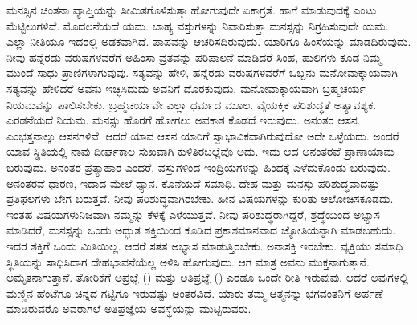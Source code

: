 ಮನಸ್ಸಿನ ಚಿಂತನಾ ವ್ಯಾಪ್ತಿಯನ್ನು ಸೀಮಿತಗೊಳಿಸುತ್ತಾ ಹೋಗುವುದೇ ಏಕಾಗ್ರತೆ. ಹಾಗೆ ಮಾಡುವುದಕ್ಕೆ ಎಂಟು ಮೆಟ್ಟಿಲುಗಳಿವೆ. ಮೊದಲನೆಯದೆ ಯಮ. ಬಾಹ್ಯ ವಸ್ತುಗಳನ್ನು ನಿವಾರಿಸುತ್ತಾ ಮನಸ್ಸನ್ನು ನಿಗ್ರಹಿಸುವುದೇ ಯಮ. ಎಲ್ಲಾ ನೀತಿಯೂ ಇದರಲ್ಲಿ ಅಡಕವಾಗಿದೆ. ಪಾಪವನ್ನು ಆಚರಿಸದಿರುವುದು. ಯಾರಿಗೂ ಹಿಂಸೆಯನ್ನು ಮಾಡದಿರುವುದು. ನೀವು ಹನ್ನೆರಡು ವರುಷಗಳವರೆಗೆ ಅಹಿಂಸಾ ವ್ರತವನ್ನು ಪರಿಪಾಲನೆ ಮಾಡಿದರೆ ಸಿಂಹ, ಹುಲಿಗಳು ಕೂಡ ನಿಮ್ಮ ಮುಂದೆ ಸಾಧು ಪ್ರಾಣಿಗಳಾಗುವುವು. ಸತ್ಯವನ್ನು ಹೇಳಿ, ಹನ್ನೆರಡು ವರುಷಗಳವರೆಗೆ ಒಬ್ಬನು ಮನೋವಾಕ್ಕಾಯವಾಗಿ ಸತ್ಯವನ್ನು ಹೇಳಿದರೆ ಅವನು ಇಚ್ಛಿಸಿದುದು ಅವನಿಗೆ ದೊರಕುವುದು. ಮನೋವಾಕ್ಕಾಯವಾಗಿ ಬ್ರಹ್ಮಚರ್ಯ ನಿಯಮವನ್ನು ಪಾಲಿಸಬೇಕು. ಬ್ರಹ್ಮಚರ್ಯವೇ ಎಲ್ಲಾ ಧರ್ಮದ ಮೂಲ. ವೈಯಕ್ತಿಕ ಪರಿಶುದ್ಧತೆ ಅತ್ಯಾವಶ್ಯಕ. ಎರಡನೆಯದೆ ನಿಯಮ. ಮನಸ್ಸು ಹೊರಗೆ ಹೋಗಲು ಅವಕಾಶ ಕೊಡದೆ ಇರುವುದು. ಅನಂತರ ಆಸನ. ಎಂಭತ್ತನಾಲ್ಕು ಆಸನಗಳಿವೆ. ಆದರೆ ಯಾವ ಆಸನ ಯಾರಿಗೆ ಸ್ವಾಭಾವಿಕವಾಗಿರುವುದೋ ಅದೇ ಒಳ್ಳೆಯದು. ಅಂದರೆ ಯಾವ ಸ್ಥಿತಿಯಲ್ಲಿ ನಾವು ದೀರ್ಘಕಾಲ ಸುಖವಾಗಿ ಕುಳಿತಿರಬಲ್ಲೆವೊ ಅದು. ಇದು ಆದ ಅನಂತರವೆ ಪ್ರಾಣಾಯಾಮ ಬರುವುದು. ಅನಂತರ ಪ್ರತ್ಯಾಹಾರ ಎಂದರೆ, ವಸ್ತುಗಳಿಂದ ಇಂದ್ರಿಯಗಳನ್ನು ಹಿಂದಕ್ಕೆ ಎಳೆದುಕೊಂಡು ಬರುವುದು. ಅನಂತರವೆ ಧಾರಣ, ಇದಾದ ಮೇಲೆ ಧ್ಯಾನ. ಕೊನೆಯದೆ ಸಮಾಧಿ. ದೇಹ ಮತ್ತು ಮನಸ್ಸು ಪರಿಶುದ್ಧವಾದಷ್ಟು ಪ್ರತಿಫಲಗಳು ಬೇಗ ಬರುತ್ತವೆ. ನೀವು ಪರಿಶುದ್ಧವಾಗಿರಬೇಕು. ಹೀನ ವಿಷಯಗಳನ್ನು ಕುರಿತು ಆಲೋಚಿಸಕೂಡದು. ಇಂತಹ ವಿಷಯಗಳು\break ನಿಜವಾಗಿ ನಮ್ಮನ್ನು ಕೆಳಕ್ಕೆ ಎಳೆಯುತ್ತವೆ. ನೀವು ಪರಿಶುದ್ಧರಾಗಿದ್ದರೆ, ಶ್ರದ್ಧೆಯಿಂದ ಅಭ್ಯಾಸ ಮಾಡಿದರೆ, ಮನಸ್ಸನ್ನು ಒಂದು ಅದ್ಭುತ ಶಕ್ತಿಯಿಂದ ಕೂಡಿದ ಪ್ರಕಾಶಮಾನವಾದ ಜ್ಯೋತಿಯನ್ನಾಗಿ ಮಾಡಬಹುದು. ಇದರ ಶಕ್ತಿಗೆ ಒಂದು ಮಿತಿಯಿಲ್ಲ. ಆದರೆ ಸತತ ಅಭ್ಯಾಸ ಮಾಡುತ್ತಿರಬೇಕು. ಅನಾಸಕ್ತಿ ಇರಬೇಕು. ವ್ಯಕ್ತಿಯು ಸಮಾಧಿ ಸ್ಥಿತಿಯನ್ನು ಸಾಧಿಸಿದಾಗ ದೇಹಭಾವನೆಯೆಲ್ಲ ಅಳಿಸಿ ಹೋಗುವುದು. ಆಗ ಮಾತ್ರ ಅವನು ಮುಕ್ತನಾಗುತ್ತಾನೆ. ಅಮೃತನಾಗುತ್ತಾನೆ. ತೋರಿಕೆಗೆ ಅಪ್ರಜ್ಞೆ () ಮತ್ತು ಅತಿಪ್ರಜ್ಞೆ () ಎರಡೂ ಒಂದೇ ರೀತಿ ಇರುವುವು. ಆದರೆ ಅವುಗಳಲ್ಲಿ ಮಣ್ಣಿನ ಹೆಂಟೆಗೂ ಚಿನ್ನದ ಗಟ್ಟಿಗೂ ಇರುವಷ್ಟು ಅಂತರವಿದೆ. ಯಾರು ತಮ್ಮ ಆತ್ಮನನ್ನು ಭಗವಂತನಿಗೆ ಅರ್ಪಣೆ ಮಾಡಿರುವರೊ ಅವರಾಗಲೆ ಅತಿಪ್ರಜ್ಞೆಯ ಅವಸ್ಥೆಯನ್ನು ಮುಟ್ಟಿರುವರು.

\vskip -0.5cm

